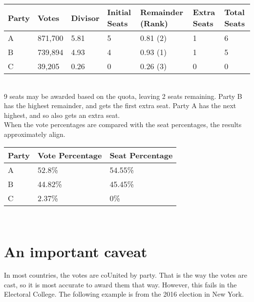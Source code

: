 \documentclass{article}
\begin{document}
    \begin{adjustbox}{center}
    \begin{tabular}{ |l|l|l|l|l|l|l| }
        \hline
        Party & Votes & Divisor & Initial Seats & Remainder (Rank) & Extra Seats & Total Seats \\
        \hline
        A & 871,700 & 5.81 & 5 & 0.81 (2) & 1 & 6 \\
        \hline
        B & 739,894 & 4.93 & 4 & 0.93 (1) & 1 & 5 \\
        \hline
        C & 39,205 & 0.26 & 0 & 0.26 (3) & 0 & 0 \\
        \hline
    \end{tabular}
    \end{adjustbox}\\
    
    9 seats may be awarded based on the quota, leaving 2 seats remaining. Party B has the highest remainder, and gets the first extra seat. Party A has the next highest, and so also gets an extra seat. \\

    When the vote percentages are compared with the seat percentages, the results approximately align.\\
    
    \begin{adjustbox}{center}
    \begin{tabular}{ |l|l|l| }
        \hline
        Party & Vote Percentage & Seat Percentage \\
        \hline
        A & 52.8\% & 54.55\% \\
        \hline
        B & 44.82\% & 45.45\% \\
        \hline
        C & 2.37\% & 0\% \\
        \hline
    \end{tabular}
    \end{adjustbox}\\

    \section{An important caveat}%

    In most countries, the votes are coUnited by party. That is the way the votes are cast, so it is most accurate to award them that way. However, this fails in the Electoral College. The following example is from the 2016 election in New York.\\
\end{document}
